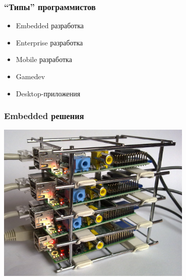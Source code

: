 \documentclass[10pt,pdf,hyperref={unicode}]{beamer}
\begin{document}
\begin{frame}
	\frametitle{``Типы'' программистов }
		\begin{itemize}
			\item Embedded разработка
			\item Enterprise разработка
			\item Mobile разработка
		\end{itemize}		

		\em
			\begin{itemize}
				\item Gamedev
				\item Desktop-приложения
			\end{itemize}		

\end{frame}


\begin{frame}
\frametitle{ Embedded решения }
	\center
		\includegraphics[width=0.7\textwidth]{./rasbery.png}
\end{frame}
\end{document}
